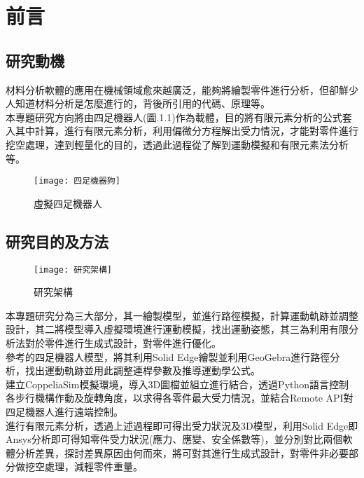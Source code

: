 \chapter{前言}
\renewcommand{\baselinestretch}{10.0} %
\setcounter{page}{1}  %
\fontsize{14pt}{2.5pt}\sectionef

\section{研究動機}
材料分析軟體的應用在機械領域愈來越廣泛，能夠將繪製零件進行分析，但卻鮮少人知道材料分析是怎麼進行的，背後所引用的代碼、原理等。\\
本專題研究方向將由四足機器人(圖.1.1)作為載體，目的將有限元素分析的公式套入其中計算，進行有限元素分析，利用偏微分方程解出受力情況，才能對零件進行挖空處理，達到輕量化的目的，透過此過程從了解到運動模擬和有限元素法分析等。\\

\begin{figure}[hbt!]
\center
\texttt{[image: 四足機器狗]}
\caption{\Large 虛擬四足機器人}\label{四足機器狗}
\end{figure}
\newpage
\section{研究目的及方法}
\begin{figure}[hbt!]
\begin{center}
\texttt{[image: 研究架構]}
\caption{\Large 研究架構}\label{研究架構}
\end{center}
\end{figure}
本專題研究分為三大部分，其一繪製模型，並進行路徑模擬，計算運動軌跡並調整設計，其二將模型導入虛擬環境進行運動模擬，找出運動姿態，其三為利用有限分析法對於零件進行生成式設計，對零件進行優化。\\
參考的四足機器人模型，將其利用Solid Edge繪製並利用GeoGebra進行路徑分析，找出運動軌跡並用此調整連桿參數及推導運動學公式。\\
建立CoppeliaSim模擬環境，導入3D圖檔並組立進行結合，透過Python語言控制各步行機構作動及旋轉角度，以求得各零件最大受力情況，並結合Remote API對四足機器人進行遠端控制。\\
進行有限元素分析，透過上述過程即可得出受力狀況及3D模型，利用Solid Edge即Ansys分析即可得知零件受力狀況(應力、應變、安全係數等)，並分別對比兩個軟體分析差異，探討差異原因由何而來，將可對其進行生成式設計，對零件非必要部分做挖空處理，減輕零件重量。\\
\newpage

